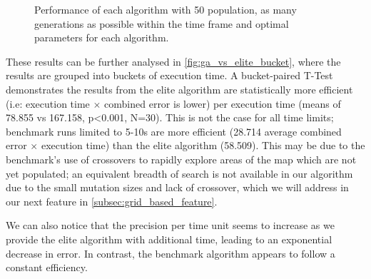 \documentclass[authoryearcitations]{UoYCSproject}
\begin{document}
\begin{figure}
	\caption[Effects of elitist against tournament selection (box-plot)]{Performance of each algorithm with 50 population, as many generations as possible within the time frame and optimal parameters for each algorithm.}
	\label{fig:ga_vs_elite_box_whiskers}
\end{figure}

These results can be further analysed in \autoref{fig:ga_vs_elite_bucket}, where the results are grouped into buckets of execution time. A bucket-paired T-Test demonstrates the results from the elite algorithm are statistically more efficient (i.e: execution time $\times$ combined error is lower) per execution time (means of 78.855 vs 167.158, p<0.001, N=30). This is not the case for all time limits; benchmark runs limited to 5-10s are more efficient (28.714 average combined error $\times$ execution time) than the elite algorithm (58.509). This may be due to the benchmark's use of crossovers to rapidly explore areas of the map which are not yet populated; an equivalent breadth of search is not available in our algorithm due to the small mutation sizes and lack of crossover, which we will address in our next feature in \autoref{subsec:grid_based_feature}. 

We can also notice that the precision per time unit seems to increase as we provide the elite algorithm with additional time, leading to an exponential decrease in error. In contrast, the benchmark algorithm appears to follow a constant efficiency. 

\datatable
\end{document}
